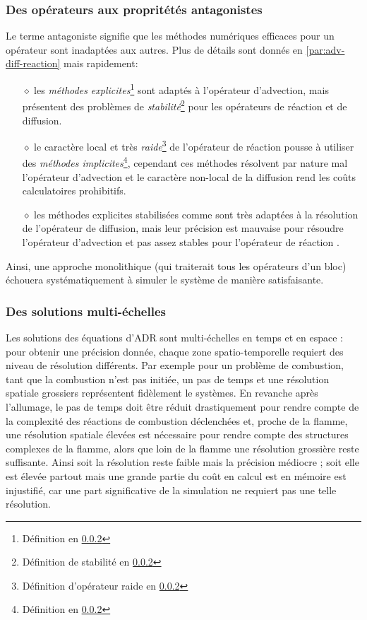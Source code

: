     \subsubsection{Des opérateurs aux propritétés antagonistes}
        Le terme antagoniste signifie que les méthodes numériques efficaces pour un opérateur sont inadaptées aux autres.
        Plus de détails sont donnés en \ref{par:adv-diff-reaction} mais rapidement:
        \begin{itemize}
            \item[$\diamond$] les \textit{méthodes explicites}\footnote{Définition en \ref{}} sont adaptés à l'opérateur d'advection\cite{}, 
            mais présentent des problèmes de \textit{stabilité}\footnote{Définition de stabilité en \ref{}} pour les  opérateurs de réaction et de diffusion.
            \item[$\diamond$] le caractère local et très \textit{raide}\footnote{Définition d'opérateur raide en \ref{}} de l'opérateur de réaction \cite{}
            pousse à utiliser des \textit{méthodes implicites}\footnote{Définition en \ref{}}, cependant ces méthodes résolvent par nature mal l'opérateur d'advection et le caractère non-local 
            de la diffusion rend les coûts calculatoires prohibitifs.
            \item[$\diamond$] les méthodes explicites stabilisées comme \cite{} sont très adaptées à la résolution de l'opérateur de diffusion, mais 
            leur précision est mauvaise pour résoudre l'opérateur d'advection \cite{} et pas assez stables pour l'opérateur de réaction \cite{}.
        \end{itemize}
        Ainsi, une approche monolithique (qui traiterait tous les opérateurs d'un bloc) échouera systématiquement à simuler le système de manière satisfaisante.
    \subsubsection{Des solutions multi-échelles}
    Les solutions des équations d'ADR sont multi-échelles en temps et en espace \cite{} : pour obtenir une précision donnée, chaque zone spatio-temporelle 
    requiert des niveau de résolution différents. Par exemple pour un problème de combustion, tant que la combustion n'est pas initiée, 
    un pas de temps et une résolution spatiale grossiers représentent fidèlement le systèmes. En revanche après l'allumage,
    le pas de temps doit être réduit drastiquement pour rendre compte de la complexité des réactions de combustion déclenchées et,
    proche de la flamme, une résolution spatiale élevées est nécessaire pour rendre compte des structures complexes de la flamme, alors que 
    loin de la flamme une résolution grossière reste suffisante.
    Ainsi soit la résolution reste faible mais la précision médiocre ; 
    soit elle est élevée partout mais une grande partie du coût en calcul est en mémoire est injustifié, 
    car une part significative de la simulation ne requiert pas une telle résolution.

